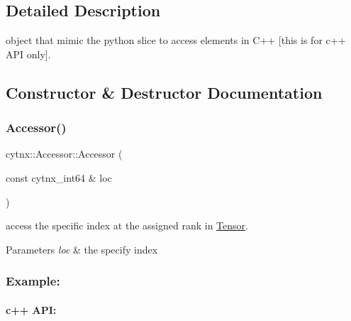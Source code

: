 \subsection{Detailed Description}
object that mimic the python slice to access elements in C++ \mbox{[}this is for c++ A\+PI only\mbox{]}. 

\subsection{Constructor \& Destructor Documentation}
\mbox{\label{classcytnx_1_1Accessor_a9f6fa9087f09756e020355a05196d384}} 
\subsubsection{\texorpdfstring{Accessor()}{Accessor()}}
{\footnotesize\ttfamily cytnx\+::\+Accessor\+::\+Accessor (\begin{DoxyParamCaption}\item[{const cytnx\+\_\+int64 \&}]{loc }\end{DoxyParamCaption})}



access the specific index at the assigned rank in \hyperlink{classcytnx_1_1Tensor}{Tensor}. 


\begin{DoxyParams}{Parameters}
{\em loc} & the specify index\\
\hline
\end{DoxyParams}
\subsubsection*{Example\+:}

\paragraph*{c++ A\+PI\+:}


